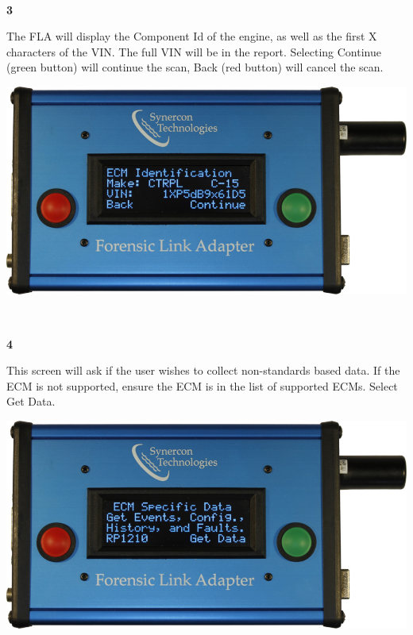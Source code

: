 \documentclass[11pt]{article}
\begin{document}
\\[\baselineskip]
\noindent\begin{minipage}{0.3\textwidth}%
\begin{center}
\textbf{3}\\[\baselineskip]
\end{center}
The FLA will display the Component Id of the engine, as well as the first X characters of the VIN. The full VIN will be in the report. Selecting Continue (green button) will continue the scan, Back (red button) will cancel the scan.
\end{minipage}%
\hfill%
\begin{minipage}{0.6\textwidth}
\includegraphics[width=\linewidth]{../../media/fla_screens/ethernet_and_others/veh_scan/comp_id}
\end{minipage}
\\[\baselineskip]
\noindent\begin{minipage}{0.3\textwidth}%
\begin{center}
\textbf{4}\\[\baselineskip]
\end{center}
This screen will ask if the user wishes to collect non-standards based data. If the ECM is not supported, ensure the ECM is in the list of supported ECMs. Select Get Data.
\end{minipage}%
\hfill%
\begin{minipage}{0.6\textwidth}
\includegraphics[width=\linewidth]{../../media/fla_screens/ethernet_and_others/veh_scan/get_ecm_specific}
\end{minipage}
\end{document}
